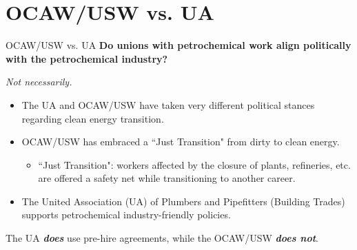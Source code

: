 \documentclass{beamer}
\begin{document}

\section*{OCAW/USW vs. UA}
\begin{frame}{OCAW/USW vs. UA}
\textbf{Do unions with petrochemical work align politically with the petrochemical industry?}\newline

\emph{Not necessarily.}
	\begin{itemize}
		\item The UA and OCAW/USW have taken very different political stances regarding clean energy transition.
		\item OCAW/USW has embraced a ``Just Transition" from dirty to clean energy.
	\begin{itemize}
		\item ``Just Transition": workers affected by the closure of plants, refineries, etc. are offered a safety net while transitioning to another career.
	\end{itemize}
	\item The United Association (UA) of Plumbers and Pipefitters (Building Trades) supports petrochemical industry-friendly policies.
	\end{itemize}
The UA \textit{\textbf{does}} use pre-hire agreements, while the OCAW/USW \textbf{\textit{does not}}.
\end{frame}
\end{document}
